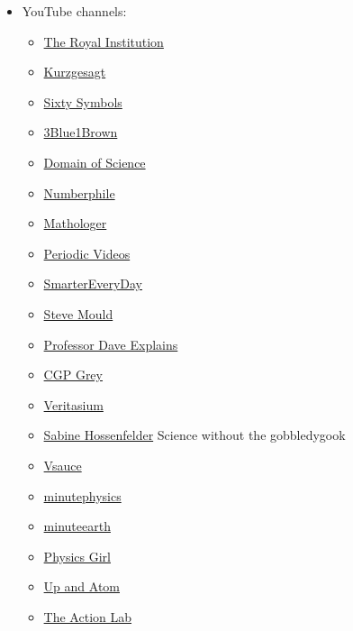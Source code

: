 \documentclass{article}
\begin{document}
\begin{itemize}
    \item YouTube channels:
    \begin{itemize}
    \item \href{https://www.youtube.com/user/TheRoyalInstitution}{The Royal Institution}
    \item \href{https://www.youtube.com/user/Kurzgesagt}{Kurzgesagt}
    \item \href{https://www.youtube.com/user/sixtysymbols}{Sixty Symbols}
    \item \href{https://www.youtube.com/channel/UCYO_jab_esuFRV4b17AJtAw}{3Blue1Brown}
    \item \href{https://www.youtube.com/channel/UCxqAWLTk1CmBvZFPzeZMd9A}{Domain of Science}
    \item \href{https://www.youtube.com/channel/UCoxcjq-8xIDTYp3uz647V5A}{Numberphile}
    \item \href{https://www.youtube.com/channel/UC1_uAIS3r8Vu6JjXWvastJg}{Mathologer}
    \item \href{https://www.youtube.com/channel/UCtESv1e7ntJaLJYKIO1FoYw}{Periodic Videos}
    \item \href{https://www.youtube.com/channel/UC6107grRI4m0o2-emgoDnAA}{SmarterEveryDay}
    \item \href{https://www.youtube.com/channel/UCEIwxahdLz7bap-VDs9h35A}{Steve Mould}
    \item \href{https://www.youtube.com/channel/UC0cd_-e49hZpWLH3UIwoWRA}{Professor Dave Explains}
    \item \href{https://www.youtube.com/channel/UC2C_jShtL725hvbm1arSV9w}{CGP Grey}
    \item \href{https://www.youtube.com/user/1veritasium}{Veritasium}
    \item \href{https://www.youtube.com/channel/UC1yNl2E66ZzKApQdRuTQ4tw}{Sabine Hossenfelder} Science without the gobbledygook
    \item \href{https://www.youtube.com/channel/UC6nSFpj9HTCZ5t-N3Rm3-HA}{Vsauce}
    \item \href{https://www.youtube.com/user/minutephysics}{minutephysics}
    \item \href{https://www.youtube.com/minuteearth}{minuteearth}
    \item \href{https://www.youtube.com/channel/UC7DdEm33SyaTDtWYGO2CwdA}{Physics Girl}
    \item \href{https://www.youtube.com/channel/UCSIvk78tK2TiviLQn4fSHaw}{Up and Atom}
    \item \href{https://www.youtube.com/@TheActionLab}{The Action Lab}

\end{itemize}
\end{itemize}
\end{document}
